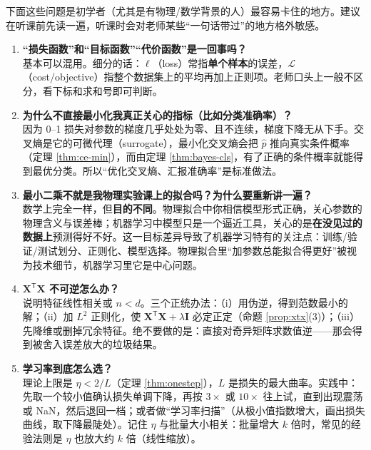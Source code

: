 \documentclass[UTF8,a4paper,11pt]{ctexart}
\theoremstyle{definition}
\theoremstyle{plain}
\theoremstyle{remark}
\newcommand{\Loss}{\mathcal{L}}
\newcommand{\T}{^{\mathsf{T}}}
\begin{document}
下面这些问题是初学者（尤其是有物理/数学背景的人）最容易卡住的地方。建议在听课前先读一遍，听课时会对老师某些“一句话带过”的地方格外敏感。

\begin{enumerate}[label=\textbf{Q\arabic*.},leftmargin=2.6em]

\item \textbf{“损失函数”和“目标函数”“代价函数”是一回事吗？}\\
基本可以混用。细分的话：$\ell$（loss）常指\textbf{单个样本}的误差，$\Loss$（cost/objective）指整个数据集上的平均再加上正则项。老师口头上一般不区分，看下标和求和号即可判断。

\item \textbf{为什么不直接最小化我真正关心的指标（比如分类准确率）？}\\
因为 0--1 损失对参数的梯度几乎处处为零、且不连续，梯度下降无从下手。交叉熵是它的可微代理（surrogate），最小化交叉熵会把 $\hat p$ 推向真实条件概率（定理 \ref{thm:ce-min}），而由定理 \ref{thm:bayes-cls}，有了正确的条件概率就能得到最优分类。所以“优化交叉熵、汇报准确率”是标准做法。

\item \textbf{最小二乘不就是我物理实验课上的拟合吗？为什么要重新讲一遍？}\\
数学上完全一样，但\textbf{目的不同}。物理拟合中你相信模型形式正确，关心参数的物理含义与误差棒；机器学习中模型只是一个逼近工具，关心的是\textbf{在没见过的数据上}预测得好不好。这一目标差异导致了机器学习特有的关注点：训练/验证/测试划分、正则化、模型选择。物理拟合里“加参数总能拟合得更好”被视为技术细节，机器学习里它是中心问题。

\item \textbf{$\bm{X}\T\bm{X}$ 不可逆怎么办？}\\
说明特征线性相关或 $n<d$。三个正统办法：（i）用伪逆，得到范数最小的解；（ii）加 $L^2$ 正则化，使 $\bm{X}\T\bm{X}+\lambda\bm{I}$ 必定正定（命题 \ref{prop:xtx}(3)）；（iii）先降维或删掉冗余特征。绝不要做的是：直接对奇异矩阵求数值逆——那会得到被舍入误差放大的垃圾结果。

\item \textbf{学习率到底怎么选？}\\
理论上限是 $\eta<2/L$（定理 \ref{thm:onestep}），$L$ 是损失的最大曲率。实践中：先取一个较小值确认损失单调下降，再按 $3\times$ 或 $10\times$ 往上试，直到出现震荡或 NaN，然后退回一档；或者做“学习率扫描”（从极小值指数增大，画出损失曲线，取下降最陡处）。记住 $\eta$ 与批量大小相关：批量增大 $k$ 倍时，常见的经验法则是 $\eta$ 也放大约 $k$ 倍（线性缩放）。


\end{enumerate}
\end{document}
